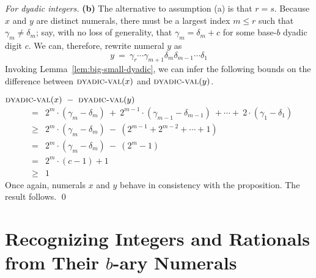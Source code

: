 \begin{proof}[For dyadic integers]
{\bf (b)} The alternative to assumption (a) is that $r = s$.  Because
$x$ and $y$ are distinct numerals, there must be a largest index $m
\leq r$ such that $\gamma_m \neq \delta_m$; say, with no loss of
generality, that $\gamma_m = \delta_m + c$ for some base-$b$ dyadic
digit $c$.  We can, therefore, rewrite numeral $y$ as
\[ y \ = \ \gamma_r \cdots \gamma_{m+1} \delta_m \delta_{m-1} \cdots \delta_1
\]
Invoking Lemma~\ref{lem:big-small-dyadic}, we can infer the following
bounds on the difference between $\mbox{\sc dyadic-val}(x)$ and
$\mbox{\sc dyadic-val}(y)$.

\bigskip

$\mbox{\sc dyadic-val}(x) \ - \ \mbox{\sc dyadic-val}(y)$
\begin{eqnarray*}
  & =  &
2^m \cdot (\gamma_m - \delta_m) \ + \ 2^{m-1} \cdot (\gamma_{m-1} -
\delta_{m-1}) \ + \cdots + \  2 \cdot (\gamma_1 - \delta_1) \\
  & \geq &
2^m \cdot (\gamma_m - \delta_m) \ - \ \left( 2^{m-1} + 2^{m-2} +
\cdots + 1 \right) \\
  & = &
2^m \cdot (\gamma_m - \delta_m)\ - \ \left( 2^m -1 \right) \\
  & = &
2^m \cdot (c-1) +1 \\
  & \geq & 1
\end{eqnarray*}
Once again, numerals $x$ and $y$ behave in consistency with the
proposition.  The result follows.
\qed
\end{proof}




\section{Recognizing Integers and  Rationals from Their $b$-ary Numerals}
\label{sec:special-numerals-N-Q}


